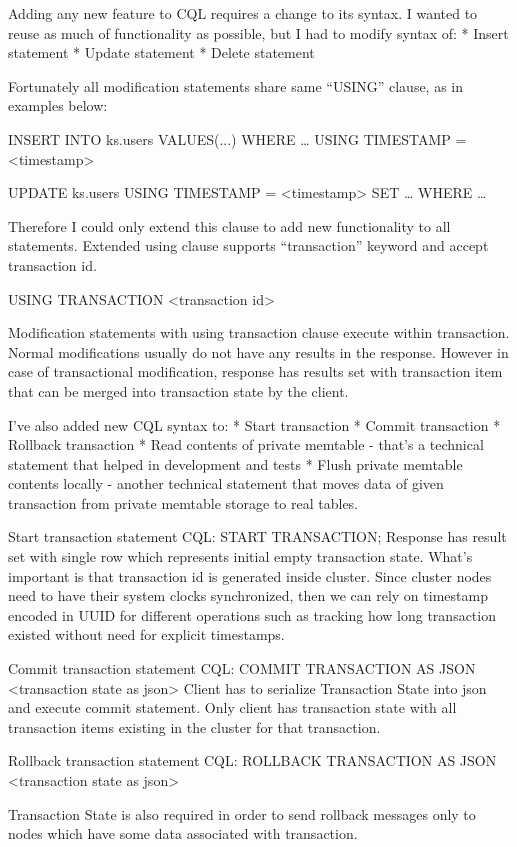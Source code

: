 Adding any new feature to CQL requires a change to its syntax. I wanted to reuse as much of functionality as possible, but I had to modify syntax of:
* Insert statement
* Update statement
* Delete statement


Fortunately all modification statements share same “USING” clause, as in examples below:


INSERT INTO ks.users VALUES(...) WHERE … USING TIMESTAMP = <timestamp>


UPDATE ks.users USING TIMESTAMP = <timestamp> SET … WHERE … 


Therefore I could only extend this clause to add new functionality to all statements. Extended using clause supports “transaction” keyword and accept transaction id.


USING TRANSACTION <transaction id>


Modification statements with using transaction clause execute within transaction. 
Normal modifications usually do not have any results in the response. However in case of transactional modification, response has results set with transaction item that can be merged into transaction state by the client.


I’ve also added new CQL syntax to:
* Start transaction
* Commit transaction
* Rollback transaction
* Read contents of private memtable - that’s a technical statement that helped in development and tests
* Flush private memtable contents locally - another technical statement that moves data of given transaction from private memtable storage to real tables.


Start transaction statement
CQL:        START TRANSACTION;
Response has result set with single row which represents initial empty transaction state. 
What’s important is that transaction id is generated inside cluster. Since cluster nodes need to have their system clocks synchronized, then we can rely on timestamp encoded in UUID for different operations such as tracking how long transaction existed without need for explicit timestamps.


Commit transaction statement
CQL: COMMIT TRANSACTION AS JSON <transaction state as json>
Client has to serialize Transaction State into json and execute commit statement. Only client has transaction state with all transaction items existing in the cluster for that transaction.


Rollback transaction statement
CQL: ROLLBACK TRANSACTION AS JSON <transaction state as json>


Transaction State is also required in order to send rollback messages only to nodes which have some data associated with transaction.





